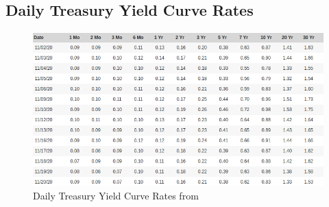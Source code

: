 \documentclass[11pt,oneside,a4paper]{article}
\begin{document}
	\subsection{Daily Treasury Yield Curve Rates}
	\begin{figure}[H]
		\centering
		\includegraphics[width=0.8\linewidth]{treasure.png}
		\caption{\label{treasure}Daily Treasury Yield Curve Rates from \cite{site_treasure}} 
	\end{figure}
	\newpage
	
	
	
	 
\end{document}
